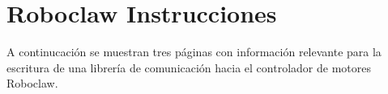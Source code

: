 \chapter{Roboclaw Instrucciones}

A continucación se muestran tres páginas con información relevante para la escritura de una librería de comunicación hacia el controlador de motores Roboclaw.




